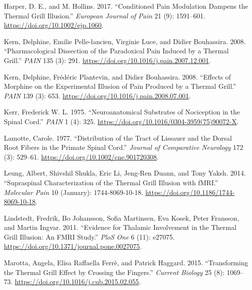\documentclass[
]{article}
\newlength{\cslhangindent}
\newlength{\cslentryspacingunit} %
\newenvironment{CSLReferences}[2] %
 {%
  \setlength{\parindent}{0pt}
  \ifodd #1
  \let\oldpar\par
  \def\par{\hangindent=\cslhangindent\oldpar}
  \fi
  \setlength{\parskip}{#2\cslentryspacingunit}
 }%
 {}
\begin{document}
\begin{CSLReferences}{1}{0}
\leavevmode{}%
Harper, D. E., and M. Hollins. 2017. {``Conditioned Pain Modulation
Dampens the Thermal Grill Illusion.''} \emph{European Journal of Pain}
21 (9): 1591--601. \url{https://doi.org/10.1002/ejp.1060}.

\leavevmode{}%
Kern, Delphine, Emilie Pelle-lancien, Virginie Luce, and Didier
Bouhassira. 2008. {``Pharmacological Dissection of the Paradoxical Pain
Induced by a Thermal Grill.''} \emph{PAIN} 135 (3): 291.
\url{https://doi.org/10.1016/j.pain.2007.12.001}.

\leavevmode{}%
Kern, Delphine, Frédéric Plantevin, and Didier Bouhassira. 2008.
{``Effects of Morphine on the Experimental Illusion of Pain Produced by
a Thermal Grill.''} \emph{PAIN} 139 (3): 653.
\url{https://doi.org/10.1016/j.pain.2008.07.001}.

\leavevmode{}%
Kerr, Frederick W. L. 1975. {``Neuroanatomical Substrates of Nociception
in the Spinal Cord.''} \emph{PAIN} 1 (4): 325.
\url{https://doi.org/10.1016/0304-3959(75)90072-X}.

\leavevmode{}%
Lamotte, Carole. 1977. {``Distribution of the Tract of Lissauer and the
Dorsal Root Fibers in the Primate Spinal Cord.''} \emph{Journal of
Comparative Neurology} 172 (3): 529--61.
\url{https://doi.org/10.1002/cne.901720308}.

\leavevmode{}%
Leung, Albert, Shivshil Shukla, Eric Li, Jeng-Ren Duann, and Tony Yaksh.
2014. {``Supraspinal {Characterization} of the {Thermal} {Grill}
{Illusion} with {fMRI}.''} \emph{Molecular Pain} 10 (January):
1744-8069-10-18. \url{https://doi.org/10.1186/1744-8069-10-18}.

\leavevmode{}%
Lindstedt, Fredrik, Bo Johansson, Sofia Martinsen, Eva Kosek, Peter
Fransson, and Martin Ingvar. 2011. {``Evidence for Thalamic Involvement
in the Thermal Grill Illusion: An {FMRI} Study.''} \emph{PloS One} 6
(11): e27075. \url{https://doi.org/10.1371/journal.pone.0027075}.

\leavevmode{}%
Marotta, Angela, Elisa Raffaella Ferrè, and Patrick Haggard. 2015.
{``Transforming the {Thermal} {Grill} {Effect} by {Crossing} the
{Fingers}.''} \emph{Current Biology} 25 (8): 1069--73.
\url{https://doi.org/10.1016/j.cub.2015.02.055}.


\end{CSLReferences}
\end{document}
